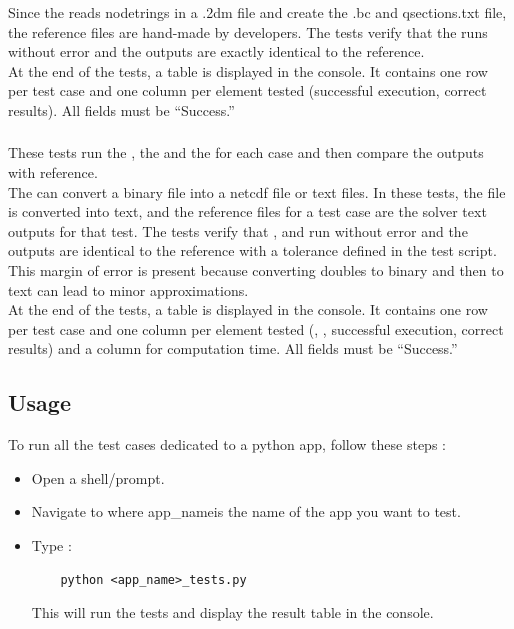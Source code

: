 Since the \swNSPreProcess reads nodetrings in a .2dm file and create the .bc and qsections.txt file, the reference files are hand-made by developers.
The tests verify that the \swNSPreProcess runs without error and the outputs are exactly identical to the reference. \\

At the end of the tests, a table is displayed in the console.
It contains one row per test case and one column per element tested (\swNSPreProcess successful execution, correct results).
All fields must be “Success.”

\subsubsection{\swOutputConverter}
These tests run the \swConverter, the \swSolver and the \swOutputConverter for each case and then compare the outputs with reference.\\

The \swOutputConverter can convert a binary file into a netcdf file or text files. In these tests, the file is converted into text, and the reference files for a test case are the solver text outputs for that test.
The tests verify that \swConverter, \swSolver and \swOutputConverter run without error and the outputs are identical to the reference with a tolerance defined in the test script.
This margin of error is present because converting doubles to binary and then to text can lead to minor approximations.\\

At the end of the tests, a table is displayed in the console.
It contains one row per test case and one column per element tested (\swConverter, \swSolver, \swOutputConverter successful execution, correct results) and a column for computation time.
All fields must be “Success.”

\subsection{Usage} \label{py_tests_usage}
To run all the test cases dedicated to a python app, follow these steps :
\begin{itemize}
    \item Open a shell/prompt.
    \item Navigate to  where \textlangle app\_name\textrangle  is the name of the app you want to test.
    \item Type :
    \begin{verbatim}
	python <app_name>_tests.py
	\end{verbatim}
    This will run the tests and display the result table in the console.
\end{itemize}